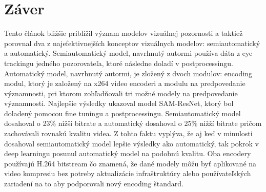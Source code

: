 \documentclass[10pt,twoside,slovak,a4paper]{article}
\begin{document}
\section{Záver} \label{zaver} 
Tento článok bližšie priblížil význam modelov vizuálnej pozornosti a taktiež porovnal dva z najefektivnejších konceptov vizuálnych modelov: semiautomatický a automatický. Semiautomatický model, navrhnutý autormi\cite{Coplien:MPD} používa dáta z eye trackingu jedného pozorovateľa, ktoré následne doladí v postprocessingu. Automatický model, navrhnutý autormi\cite{Czarnecki:Progress}, je zložený z dvoch modulov: encoding modul, ktorý je založený na x264 video encoderi a modulu na predpovedanie významnosti, pri ktorom zohľadňovali tri možné modely na predpovedanie významnosti. Najlepšie výsledky ukazoval model SAM-ResNet, ktorý bol doladený pomocou fine tuningu a postprocessingu. Semiautomatický model dosahoval o 23\% nižší bitrate a automatický dosahoval o 25\% nižží bitrate pričom zachovávali rovnakú kvalitu videa. Z tohto faktu vyplýva, že aj keď v minulosti dosahoval semiautomatický model lepšie výsledky ako automatický, tak pokrok v deep learningu posunul automatický model na podobnú kvalitu. Oba encodery používajú H.264 bitstream čo znamená, že dané modely môžu byť aplikované na video kompresiu bez potreby aktualizácie infraštruktúry alebo používateľských zariadení na to aby podporovali nový encoding štandard.


\end{document}
